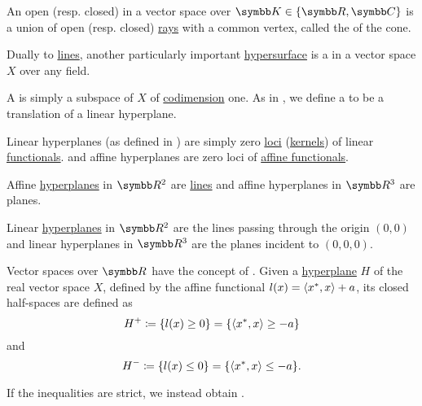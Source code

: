\begin{definition}\label{def:geometric_cone}
  An open (resp. closed)  in a vector space over \( \BK \in \{ \BR, \BC \} \) is a union of open (resp. closed) \hyperref[def:geometric_ray]{rays} with a common vertex, called the  of the cone.
\end{definition}

\begin{definition}\label{def:hyperplane}
  Dually to \hyperref[def:geometric_line]{lines}, another particularly important \hyperref[def:hypersurface]{hypersurface} is a  in a vector space \( X \) over any field.

  \begin{DefEnum}
     A  is simply a subspace of \( X \) of \hyperref[def:vector_space_dimension]{codimension} one. As in , we define a  to be a translation of a linear hyperplane.

     Linear hyperplanes (as defined in ) are simply zero \hyperref[def:zero_locus]{loci} (\hyperref[def:semiring_kernel]{kernels}) of linear \hyperref[def:linear_operator]{functionals}. and affine hyperplanes are zero loci of \hyperref[def:affine_operator]{affine functionals}.
  \end{DefEnum}
\end{definition}

\begin{example}\label{ex:hyperplanes}
  Affine \hyperref[def:hyperplane]{hyperplanes} in \( \BR^2 \) are \hyperref[def:geometric_line]{lines} and affine hyperplanes in \( \BR^3 \) are planes.

  Linear \hyperref[def:hyperplane]{hyperplanes} in \( \BR^2 \) are the lines passing through the origin \( (0, 0) \) and linear hyperplanes in \( \BR^3 \) are the planes incident to \( (0, 0, 0) \).
\end{example}

\begin{definition}\label{def:half_space}
  Vector spaces over \( \BR \) have the concept of . Given a \hyperref[def:hyperplane]{hyperplane} \( H \) of the real vector space \( X \), defined by the affine functional \( l(x) = \left\langle x^*, x \right\rangle + a \), its closed half-spaces are defined as
  \begin{equation*}
    H^+ \coloneqq \{ l(x) \geq 0 \} = \{ \left\langle x^*, x \right\rangle \geq -a \}
  \end{equation*}
  and
  \begin{equation*}
    H^- \coloneqq \{ l(x) \leq 0 \} = \{ \left\langle x^*, x \right\rangle \leq -a \}.
  \end{equation*}

  If the inequalities are strict, we instead obtain .
\end{definition}

